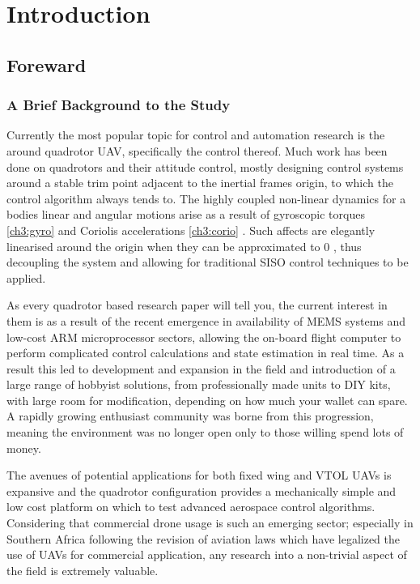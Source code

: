 \chapter{Introduction}
\label{ch:ch1}
\section{Foreward}
\label{sec:ch1.foreward}
\subsection{A Brief Background to the Study}
\label{subsec:ch1.foreward.background}
Currently the most popular topic for control and automation research is the around quadrotor UAV, specifically the control thereof. Much work has been done on quadrotors and their attitude control, mostly designing control systems around a stable trim point adjacent to the inertial frames origin, to which the control algorithm always tends to. The highly coupled non-linear dynamics for a bodies linear and angular motions arise as a result of gyroscopic torques \ref{ch3:gyro} and Coriolis accelerations \ref{ch3:corio} . Such affects are elegantly linearised around the origin when they can be approximated to 0 \cite{quaddynamics} , thus decoupling the system and allowing for traditional SISO control techniques to be applied.
\par
As every quadrotor based research paper will tell you, the current interest in them is as a result of the recent emergence in availability of MEMS systems and low-cost ARM microprocessor sectors, allowing the on-board flight computer to perform complicated control calculations and state estimation in real time. As a result this led to development and expansion in the field and introduction of a large range of hobbyist solutions, from professionally made units to DIY kits, with large room for modification, depending on how much your wallet can spare. A rapidly growing enthusiast community was borne from this progression, meaning the environment was no longer open only to those willing spend lots of money.
\par
The avenues of potential applications for both fixed wing and VTOL UAVs is expansive and the quadrotor configuration provides a mechanically simple and low cost platform on which to test advanced aerospace control algorithms. Considering that commercial drone usage is such an emerging sector; especially in Southern Africa following the revision of aviation laws \cite{safedrone} which have legalized the use of UAVs for commercial application, any research into a non-trivial aspect of the field is extremely valuable. 
